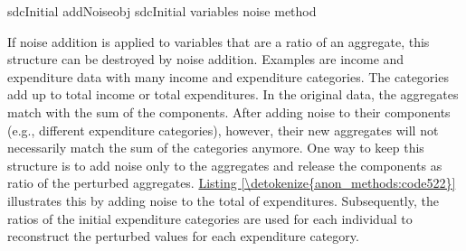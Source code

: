 \documentclass[letterpaper,10pt,english]{sphinxmanual}
\begin{document}
\def\sphinxLiteralBlockLabel{\label{\detokenize{anon_methods:code521}}}
%
\begin{sphinxVerbatim}[commandchars=\\\{\},numbers=left,firstnumber=1,stepnumber=1]
sdcInitial  addNoiseobj  sdcInitial
                       variables    
                                       
                                       
                                       
                       noise   method  
\end{sphinxVerbatim}

If noise addition is applied to variables that are a ratio of an
aggregate, this structure can be destroyed by noise addition. Examples
are income and expenditure data with many income and expenditure
categories. The categories add up to total income or total expenditures.
In the original data, the aggregates match with the sum of the
components. After adding noise to their components (e.g., different
expenditure categories), however, their new aggregates will not
necessarily match the sum of the categories anymore. One way to keep
this structure is to add noise only to the aggregates and release the
components as ratio of the perturbed aggregates. \hyperref[\detokenize{anon_methods:code522}]{Listing \ref{\detokenize{anon_methods:code522}}}
illustrates this by adding noise to the total of expenditures.
Subsequently, the ratios of the initial expenditure categories are used
for each individual to reconstruct the perturbed values for each
expenditure category.
\end{document}

